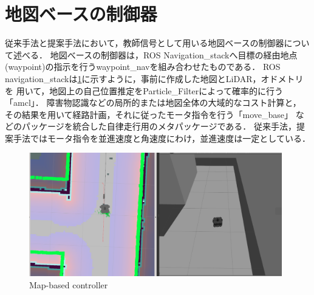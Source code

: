 \section{地図ベースの制御器}
    \label{seigyo}
    従来手法と提案手法において，教師信号として用いる地図ベースの制御器について述べる．
    地図べースの制御器は，ROS Navigation\_stack\cite{navigation:online}へ目標の経由地点(waypoint)の指示を行うwaypoint\_navを組み合わせたものである．
    ROS navigation\_stackは\ref{fig::mapbase}に示すように，事前に作成した地図とLiDAR，オドメトリを
    用いて，地図上の自己位置推定をParticle\_Filterによって確率的に行う「amcl」．
    障害物認識などの局所的または地図全体の大域的なコスト計算と，
    その結果を用いて経路計画，それに従ったモータ指令を行う「move\_base」
    などのパッケージを統合した自律走行用のメタパッケージである．
    従来手法，提案手法ではモータ指令を並進速度と角速度にわけ，並進速度は一定としている．
    
    

    \begin{figure}[H]
        \centering
        \includegraphics[width = 11cm]{./figs/mapbased.png}
        \caption{Map-based controller}
        \label{fig::mapbase}
    \end{figure}
\newpage
